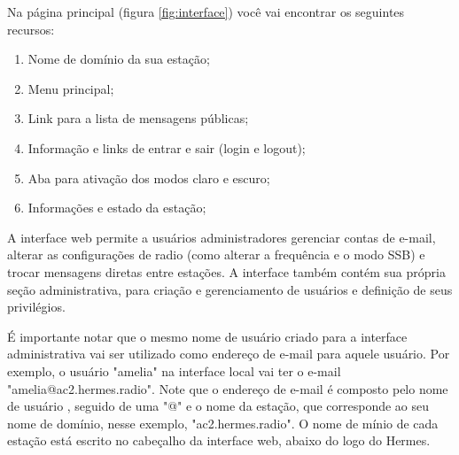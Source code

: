 \documentclass[11pt,a4paper]{article}
\begin{document}
Na página principal (figura \ref{fig:interface}) você vai encontrar os seguintes recursos:

\begin{enumerate}
    \item Nome de domínio da sua estação;
    \item Menu principal;
    \item Link para a lista de mensagens públicas;
     \item Informação e links de entrar e sair (login e logout);
     \item Aba para ativação dos modos claro e escuro;
    \item Informações e estado da estação;
\end{enumerate}

A interface web permite a usuários administradores gerenciar contas de e-mail, alterar as configurações de radio (como alterar a frequência e o modo SSB) e trocar mensagens diretas entre estações. A interface também contém sua própria seção administrativa, para criação e gerenciamento de usuários e definição de seus privilégios.     

É importante notar que o mesmo nome de usuário criado para a interface administrativa vai ser utilizado como endereço de e-mail para aquele usuário. Por exemplo, o usuário "amelia" na interface local vai ter o e-mail "amelia@ac2.hermes.radio". Note que o endereço de e-mail é composto pelo nome de usuário , seguido de uma "@" e o nome da estação, que corresponde ao seu nome de domínio, nesse exemplo, "ac2.hermes.radio". O nome de mínio de cada estação está escrito no cabeçalho da interface web, abaixo do logo do Hermes. 


\end{document}

